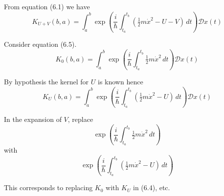 


\bigskip
From equation (6.1) we have
\begin{equation*}
K_{U+V}(b,a)=\int_a^b
\exp\left(\frac{i}{\hbar}\int_{t_a}^{t_b}\left(\tfrac{1}{2}m\dot x^2-U-V\right)\,dt\right)
\mathcal Dx(t)
\end{equation*}

Consider equation (6.5).
\begin{equation*}
K_0(b,a)=\int_a^b\exp\left(\frac{i}{\hbar}\int_{t_a}^{t_b}\tfrac{1}{2}m\dot x^2\,dt\right)
\mathcal Dx(t)
\tag{6.5}
\end{equation*}

By hypothesis the kernel for $U$ is known hence
\begin{equation*}
K_U(b,a)=\int_a^b
\exp\left(\frac{i}{\hbar}\int_{t_a}^{t_b}\left(\tfrac{1}{2}m\dot x^2-U\right)\,dt\right)
\mathcal Dx(t)
\end{equation*}

In the expansion of $V$, replace
\begin{equation*}
\exp\left(\frac{i}{\hbar}\int_{t_a}^{t_b}\tfrac{1}{2}m\dot x^2\,dt\right)
\end{equation*}
with
\begin{equation*}
\exp\left(\frac{i}{\hbar}\int_{t_a}^{t_b}\left(\tfrac{1}{2}m\dot x^2-U\right)\,dt\right)
\end{equation*}

This corresponds to replacing $K_0$ with $K_U$ in (6.4), etc.


